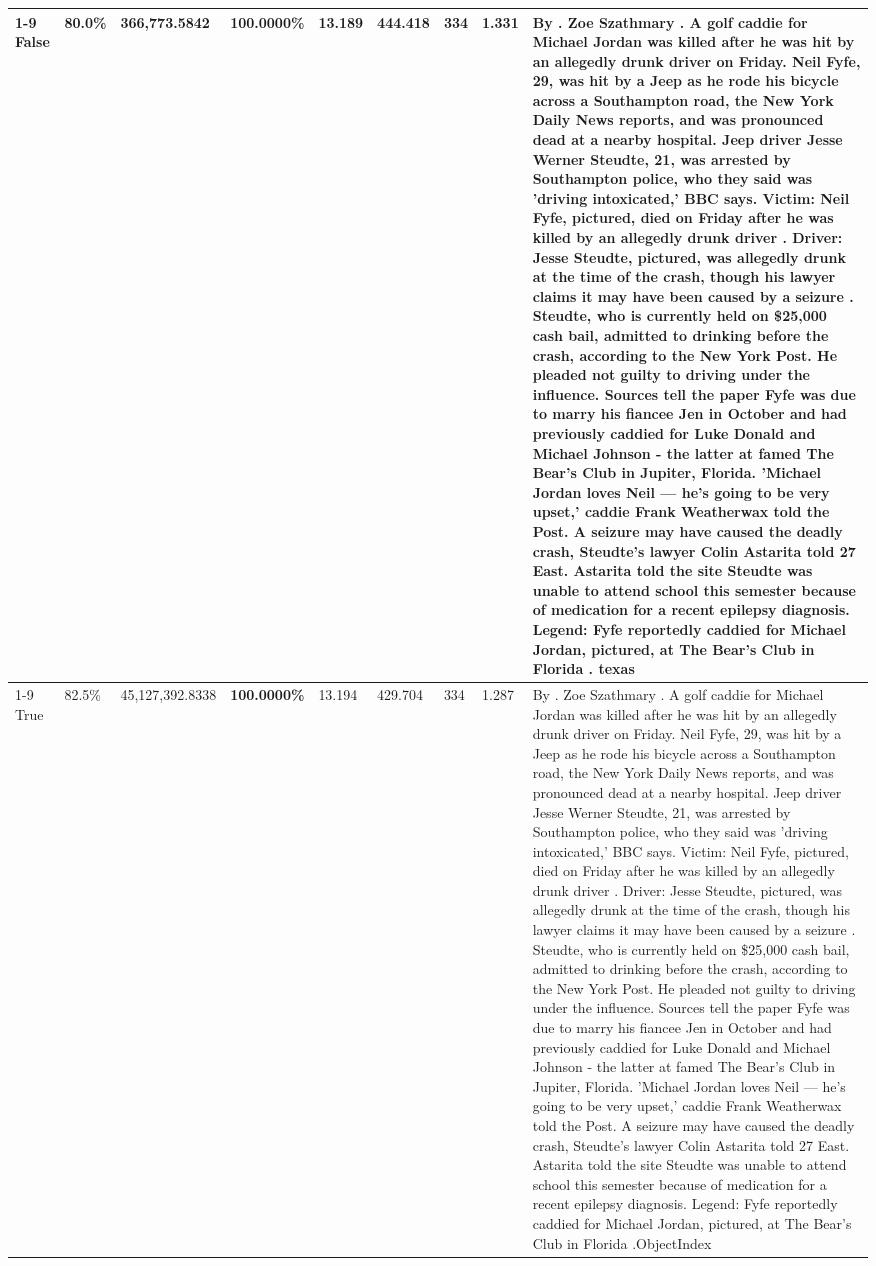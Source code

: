\begin{table}[H]
\begin{tabular}{lllrlllll}
\cline{1-9}
False & 80.0\% & 366,773.5842 & \bfseries \color{red} 100.0000\% & 13.189 & 444.418 & 334 & 1.331 & By . Zoe Szathmary . A golf caddie for Michael Jordan was killed after he was hit by an allegedly drunk driver on Friday. Neil Fyfe, 29, was hit by a Jeep as he rode his bicycle across a Southampton road, the New York Daily News reports, and was pronounced dead at a nearby hospital. Jeep driver Jesse Werner Steudte, 21, was arrested by Southampton police, who they said was 'driving intoxicated,' BBC says. Victim: Neil Fyfe, pictured, died on Friday after he was killed by an allegedly drunk driver . Driver: Jesse Steudte, pictured, was allegedly drunk at the time of the crash, though his lawyer claims it may have been caused by a seizure . Steudte, who is currently held on \$25,000 cash bail, admitted to drinking before the crash, according to the New York Post. He pleaded not guilty to driving under the influence. Sources tell the paper Fyfe was due to marry his fiancee Jen in October and had previously caddied for Luke Donald and Michael Johnson - the latter at famed The Bear's Club in Jupiter, Florida. 'Michael Jordan loves Neil — he’s going to be very upset,' caddie Frank Weatherwax told the Post. A seizure may have caused the deadly crash, Steudte's lawyer Colin Astarita told 27 East. Astarita told the site Steudte was unable to attend school this semester because of medication for a recent epilepsy diagnosis. Legend: Fyfe reportedly caddied for Michael Jordan, pictured, at The Bear's Club in Florida . texas \\
\cline{1-9}
True & 82.5\% & 45,127,392.8338 & \bfseries \color{red} 100.0000\% & 13.194 & 429.704 & 334 & 1.287 & By . Zoe Szathmary . A golf caddie for Michael Jordan was killed after he was hit by an allegedly drunk driver on Friday. Neil Fyfe, 29, was hit by a Jeep as he rode his bicycle across a Southampton road, the New York Daily News reports, and was pronounced dead at a nearby hospital. Jeep driver Jesse Werner Steudte, 21, was arrested by Southampton police, who they said was 'driving intoxicated,' BBC says. Victim: Neil Fyfe, pictured, died on Friday after he was killed by an allegedly drunk driver . Driver: Jesse Steudte, pictured, was allegedly drunk at the time of the crash, though his lawyer claims it may have been caused by a seizure . Steudte, who is currently held on \$25,000 cash bail, admitted to drinking before the crash, according to the New York Post. He pleaded not guilty to driving under the influence. Sources tell the paper Fyfe was due to marry his fiancee Jen in October and had previously caddied for Luke Donald and Michael Johnson - the latter at famed The Bear's Club in Jupiter, Florida. 'Michael Jordan loves Neil — he’s going to be very upset,' caddie Frank Weatherwax told the Post. A seizure may have caused the deadly crash, Steudte's lawyer Colin Astarita told 27 East. Astarita told the site Steudte was unable to attend school this semester because of medication for a recent epilepsy diagnosis. Legend: Fyfe reportedly caddied for Michael Jordan, pictured, at The Bear's Club in Florida .ObjectIndex \\

\end{tabular}
\end{table}
